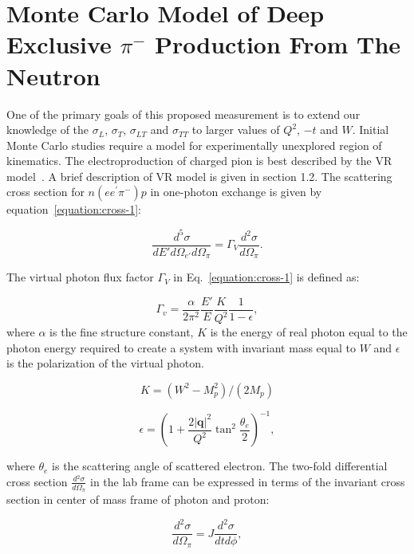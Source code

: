 
\section{Monte Carlo Model of Deep Exclusive $\pi^{-}$ Production From The
  Neutron}

One of the primary goals of this proposed measurement is to extend our
knowledge of the $\sigma_{L}$, $\sigma_{T}$, $\sigma_{LT}$ and $\sigma_{TT}$ to
larger values of $Q^2$, $-t$ and $W$. Initial Monte Carlo studies require a
model for experimentally unexplored region of kinematics. The electroproduction
of charged pion is best described by the VR model~\cite{vr}. A brief
description of VR model is given in section 1.2. The scattering cross section
for $n(ee^{\prime}\pi^{-})p$ in one-photon exchange is given by
equation~\ref{equation:cross-1}:

\begin{equation}
  \frac{d^{5} \sigma}{dE' d\Omega_{e'} d\Omega_{\pi}} = \Gamma_{V} \frac{d{^2}
    \sigma}{d\Omega_{\pi}}.
  \label{equation:cross-1}
\end{equation}

The virtual photon flux factor $\Gamma_{V}$ in Eq.~\ref{equation:cross-1} is
defined as:

\begin{equation}
  \Gamma_v=\frac{\alpha}{2\pi^2} \frac{E'}{E} \frac{K}{Q^2}\frac{1}{1-\epsilon},
  \label{equation:photon-flux-1}
\end{equation}
where $\alpha$ is the fine structure constant, $K$ is the energy of real photon
equal to the photon energy required to create a system with invariant mass
equal to $W$ and $\epsilon$ is the polarization of the virtual photon.

\begin{equation}
  K=(W^2-M_p^2)/(2 M_p)
  \label{equation:photon-flux-2}
\end{equation}

\begin{equation}
  \epsilon=\left(1+\frac{2 |\mathbf{q}|^2}{Q^2} \tan^2\frac{\theta_{e}}{2}
  \right)^{-1},
  \label{equation:photon-flux-3}
\end{equation}

where $\theta_{e}$ is the scattering angle of scattered electron. The two-fold
differential cross section $\frac{d{^2} \sigma}{d\Omega_{\pi}}$ in the lab
frame can be expressed in terms of the invariant cross section in center of
mass frame of photon and proton:

\begin{equation}
  \frac{d^2 \sigma}{d\Omega_\pi}= J \frac{d^2 \sigma}{dt d\phi},
  \label{equation:cross-2}
\end{equation}

